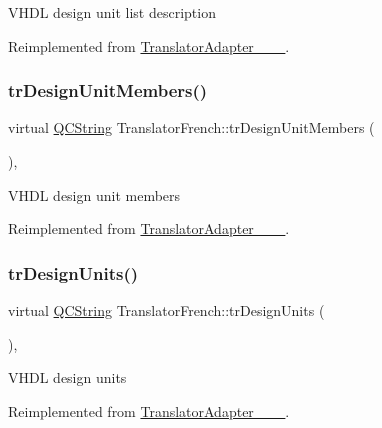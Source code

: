 V\+H\+DL design unit list description 

Reimplemented from \mbox{\hyperlink{class_translator_adapter__1__8__15}{Translator\+Adapter\+\_\+\_\+\_}}.

\mbox{\label{class_translator_french_a8ad669c0ac30eb572318ff0274c0ae2b}} 
\subsubsection{\texorpdfstring{trDesignUnitMembers()}{trDesignUnitMembers()}}
{\footnotesize\ttfamily virtual \mbox{\hyperlink{class_q_c_string}{Q\+C\+String}} Translator\+French\+::tr\+Design\+Unit\+Members (\begin{DoxyParamCaption}{ }\end{DoxyParamCaption})\hspace{0.3cm}{\ttfamily [inline]}, {\ttfamily [virtual]}}

V\+H\+DL design unit members 

Reimplemented from \mbox{\hyperlink{class_translator_adapter__1__8__15}{Translator\+Adapter\+\_\+\_\+\_}}.

\mbox{\label{class_translator_french_a7fa9edf7b2c8c0a18552b5a15dd1f781}} 
\subsubsection{\texorpdfstring{trDesignUnits()}{trDesignUnits()}}
{\footnotesize\ttfamily virtual \mbox{\hyperlink{class_q_c_string}{Q\+C\+String}} Translator\+French\+::tr\+Design\+Units (\begin{DoxyParamCaption}{ }\end{DoxyParamCaption})\hspace{0.3cm}{\ttfamily [inline]}, {\ttfamily [virtual]}}

V\+H\+DL design units 

Reimplemented from \mbox{\hyperlink{class_translator_adapter__1__8__15}{Translator\+Adapter\+\_\+\_\+\_}}.

\mbox{\label{class_translator_french_a891805463fc17c9306768b5fb6ebf9a1}} 
